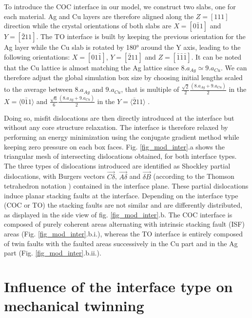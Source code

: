 \documentclass[final,3p,times,twocolumn]{elsarticle}
\begin{document}
To introduce the COC interface in our model, we construct two slabs, one for each material. Ag and Cu layers are therefore aligned along the $Z=[111]$ direction while the crystal orientations of both slabs are $X=[0\bar{1}1]$ and $Y=[\bar{2}11]$. The TO interface is built by keeping the previous orientation for the Ag layer while the Cu slab is rotated by 180° around the Y axis, leading to the following orientations: $X=[01\bar{1}]$, $Y=[\bar{2}11]$ and $Z=[\bar{1}\bar{1}\bar{1}]$. It can be noted that the Cu lattice is almost matching the Ag lattice since $8.a_{Ag}\simeq9.a_{Cu}$. 
We can therefore adjust the global simulation box size by choosing initial lengths scaled to the average between $8.a_{Ag}$ and $9.a_{Cu}$, that is multiple of 
$\frac{\sqrt{2}}{2}\frac{(8.a_{Ag}+9.a_{Cu})}{2}$ in the $X=\langle0\bar{1}1\rangle$ and $\frac{\sqrt{6}}{6}\frac{(8.a_{Ag}+9.a_{Cu})}{2}$ in the $Y=\langle\bar{2}11\rangle$ \cite{li15PM}. 

Doing so, misfit dislocations are then directly introduced at the interface but without any core structure relaxation. The interface is therefore relaxed by performing an energy minimization using the conjugate gradient method while keeping zero pressure on each box faces. Fig. \ref{fig_mod_inter}.a shows the triangular mesh of intersecting dislocations obtained, for both interface types. The three types of dislocations introduced are identified as Shockley partial dislocations, with Burgers vectors $\overrightarrow{C\delta}$, $\overrightarrow{A\delta}$ and $\overrightarrow{\delta B}$ (according to the Thomson tetrahedron notation  \cite{hirth82book}) contained in the interface plane. These partial dislocations induce planar stacking faults at the interface. Depending on the interface type (COC or TO) the stacking faults are not similar and are differently distributed, as displayed in the side view of fig. \ref{fig_mod_inter}.b. The COC interface is composed of purely coherent areas alternating with intrinsic stacking fault (ISF) areas (Fig. \ref{fig_mod_inter}.b.i.), whereas the TO interface is entirely composed of twin faults with the faulted areas successively in the Cu part and in the Ag part (Fig. \ref{fig_mod_inter}.b.ii.).

\section{Influence of the interface type on mechanical twinning}
\label{part_influence}
\end{document}
